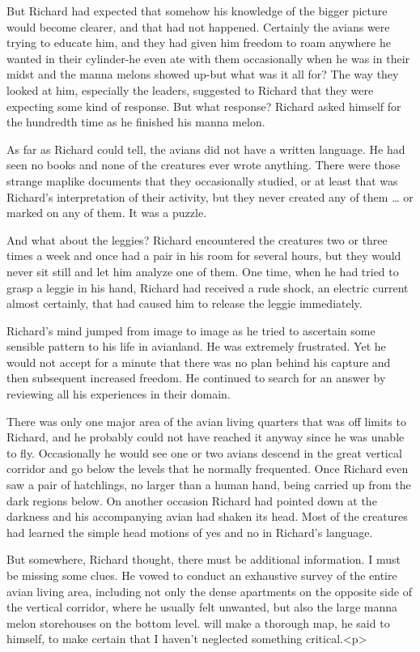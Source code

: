 \documentclass[]{article}
\begin{document}
{But Richard had expected that somehow his knowledge of the bigger picture would become clearer, and that had not happened. Certainly the avians were trying to educate him, and they had given him freedom to roam anywhere he wanted in their cylinder-he even ate with them occasionally when he was in their midst and the manna melons showed up-but what was it all for? The way they looked at him, especially the leaders, suggested to Richard that they were expecting some kind of response. But what response? Richard asked himself for the hundredth time as he finished his manna melon.

As far as Richard could tell, the avians did not have a written language. He had seen no books and none of the creatures ever wrote anything. There were those strange maplike documents that they occasionally studied, or at least that was Richard’s interpretation of their activity, but they never created any of them … or marked on any of them. It was a puzzle.

And what about the leggies? Richard encountered the creatures two or three times a week and once had a pair in his room for several hours, but they would never sit still and let him analyze one of them. One time, when he had tried to grasp a leggie in his hand, Richard had received a rude shock, an electric current almost certainly, that had caused him to release the leggie immediately.

Richard’s mind jumped from image to image as he tried to ascertain some sensible pattern to his life in avianland. He was extremely frustrated. Yet he would not accept for a minute that there was no plan behind his capture and then subsequent increased freedom. He continued to search for an answer by reviewing all his experiences in their domain.

There was only one major area of the avian living quarters that was off limits to Richard, and he probably could not have reached it anyway since he was unable to fly. Occasionally he would see one or two avians descend in the great vertical corridor and go below the levels that he normally frequented. Once Richard even saw a pair of hatchlings, no larger than a human hand, being carried up from the dark regions below. On another occasion Richard had pointed down at the darkness and his accompanying avian had shaken its head. Most of the creatures had learned the simple head motions of yes and no in Richard’s language.

But somewhere, Richard thought, there must be additional information. I must be missing some clues. He vowed to conduct an exhaustive survey of the entire avian living area, including not only the dense apartments on the opposite side of the vertical corridor, where he usually felt unwanted, but also the large manna melon storehouses on the bottom level. will make a thorough map, he said to himself, to make certain that I haven’t neglected something critical.<p>

}
\end{document}
